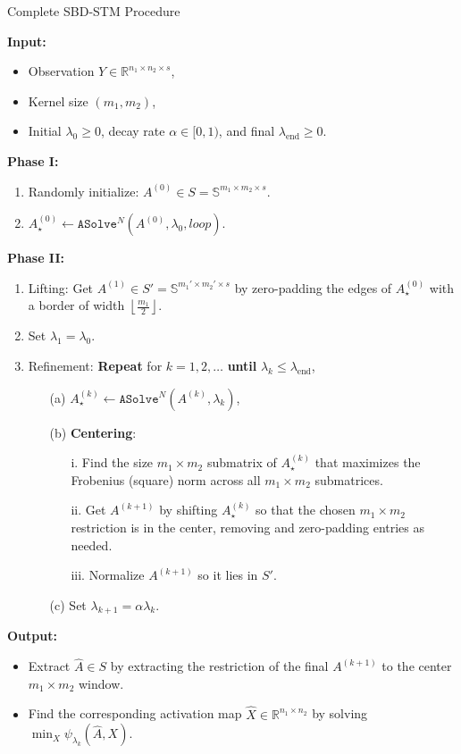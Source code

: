 \begin{algorithm}
	\label{SBDalgo}
	\caption{Complete SBD-STM Procedure}
	\textbf{Input:}
	\begin{itemize}
		\item Observation $Y \in \mathbb{R}^{n_1 \times n_2 \times s}$,
		\item Kernel size $(m_1, m_2)$,
		\item Initial $\lambda_0 \geq 0$, decay rate $\alpha \in [0,1)$, and final $\lambda_{\text{end}} \geq 0$.
	\end{itemize}
	
	\textbf{Phase I:}
	\begin{enumerate}
		\item Randomly initialize: $A^{(0)} \in S = \mathbb{S}^{m_1 \times m_2 \times s}$.
		\item $A_\star^{(0)} \leftarrow \texttt{ASolve}^N(A^{(0)}, \lambda_0, loop)$.
	\end{enumerate}
	
	\textbf{Phase II:}
	\begin{enumerate}
		\item Lifting: Get $A^{(1)} \in S' = \mathbb{S}^{m_1' \times m_2' \times s}$ by zero-padding the edges of $A_\star^{(0)}$ with a border of width $\left\lfloor \frac{m_1}{2} \right\rfloor$.
		\item Set $\lambda_1 = \lambda_0$.
		\item Refinement: \textbf{Repeat} for $k = 1, 2, \dots$ \textbf{until} $\lambda_k \leq \lambda_{\text{end}}$,
		\begin{enumerate}
			\item[(a)] $A_\star^{(k)} \leftarrow \texttt{ASolve}^N(A^{(k)}, \lambda_k)$,
			\item[(b)] \textbf{Centering}:
			\begin{enumerate}
				\item[i.] Find the size $m_1 \times m_2$ submatrix of $A_\star^{(k)}$ that maximizes the Frobenius (square) norm across all $m_1 \times m_2$ submatrices.
				\item[ii.] Get $A^{(k+1)}$ by shifting $A_\star^{(k)}$ so that the chosen $m_1 \times m_2$ restriction is in the center, removing and zero-padding entries as needed.
				\item[iii.] Normalize $A^{(k+1)}$ so it lies in $S'$.
			\end{enumerate}
			\item[(c)] Set $\lambda_{k+1} = \alpha \lambda_k$.
		\end{enumerate}
	\end{enumerate}
	
	\textbf{Output:}
	\begin{itemize}
		\item Extract $\hat{A} \in S$ by extracting the restriction of the final $A^{(k+1)}$ to the center $m_1 \times m_2$ window.
		\item Find the corresponding activation map $\hat{X} \in \mathbb{R}^{n_1 \times n_2}$ by solving $\min_{X} \psi_{\lambda_k}(\hat{A}, X)$.
	\end{itemize}
\end{algorithm}

